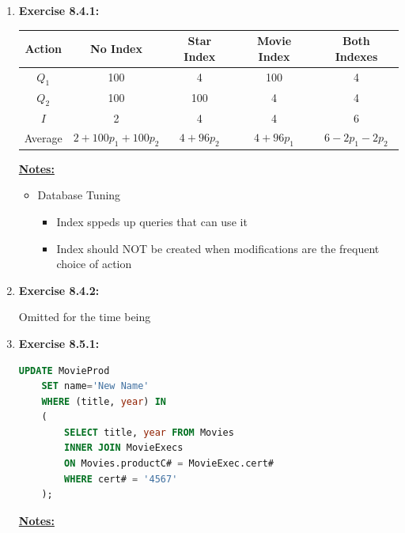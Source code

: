 \documentclass[12pt]{article}
\begin{document}
\begin{enumerate}[1.]
\begin{enumerate}[a)]
    \end{enumerate}

    \item \textbf{Exercise 8.4.1:}

    \bigskip

    \begin{tabular}{c|cccc}
        Action & No Index & Star Index & Movie Index & Both Indexes\\
        \hline
        $Q_1$ & 100 & 4 & 100 & 4\\
        \hline
        $Q_2$ & 100 & 100 & 4 & 4\\
        \hline
        $I$ & 2 & 4 & 4 & 6\\
        \hline
        Average & $2 + 100p_1 + 100p_2$ & $4 + 96p_2$ & $4 + 96p_1$ & $6 - 2p_1 - 2p_2$\\
    \end{tabular}

    \bigskip

    \underline{\textbf{Notes:}}

    \bigskip

    \begin{itemize}
        \item Database Tuning
        \begin{itemize}
            \item Index sppeds up queries that can use it
            \item Index should NOT be created when modifications are the frequent
            choice of action
        \end{itemize}
    \end{itemize}

    \item \textbf{Exercise 8.4.2:}

    Omitted for the time being

    \item \textbf{Exercise 8.5.1:}

    \bigskip

    \begin{lstlisting}[language=SQL]
    UPDATE MovieProd
    SET name='New Name'
    WHERE (title, year) IN
    (
        SELECT title, year FROM Movies
        INNER JOIN MovieExecs
        ON Movies.productC# = MovieExec.cert#
        WHERE cert# = '4567'
    );
    \end{lstlisting}

    \bigskip

    \underline{\textbf{Notes:}}


\end{enumerate}
\end{document}
